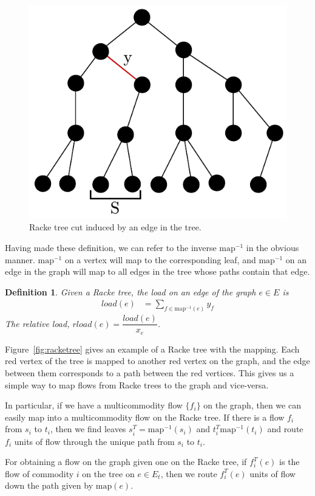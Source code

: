 \documentclass[12pt]{article}
\newtheorem{definition}{Definition}
\begin{document}
\begin{figure}
\centering
\label{fig:rackecut}
\includegraphics[width=0.5\linewidth]{Rackecut.pdf}
\caption{Racke tree cut induced by an edge in the tree.}
\end{figure}

Having made these definition, we can refer to the inverse $\text{map}^{-1}$ in the obvious manner. $\text{map}^{-1}$ on a vertex will map to the corresponding leaf, and $\text{map}^{-1}$ on an edge in the graph will map to all edges in the tree whose paths contain that edge. 

\begin{definition}
Given a Racke tree, the load on an edge of the graph $e \in E$ is
\begin{align}
load(e) &= \sum_{f \in \text{map}^{-1}(e)} y_f
\end{align}
The relative load, $rload(e) = \dfrac{load(e)}{x_e}$. 
\end{definition}

Figure~\ref{fig:racketree} gives an example of a Racke tree with the mapping. Each red vertex of the tree is mapped to another red vertex on the graph, and the edge between them corresponds to a path between the red vertices. This gives us a simple way to map flows from Racke trees to the graph and vice-versa. 

In particular, if we have a multicommodity flow $\{ f_i \}$ on the graph, then we can easily map into a multicommodity flow on the Racke tree. If there is a flow $f_i$ from $s_i$ to $t_i$, then we find leaves $s_i^{T}=\text{map}^{-1}(s_i)$ and $t_i^T\text{map}^{-1}(t_i)$ and route $f_i$ units of flow through the unique path from $s_i$ to $t_i$.

For obtaining a flow on the graph given one on the Racke tree, if $f_i^T(e)$ is the flow of commodity $i$ on the tree on $e \in E_t$, then we route $f_i^T(e)$ units of flow down the path given by $\text{map}(e)$.   
\end{document}
